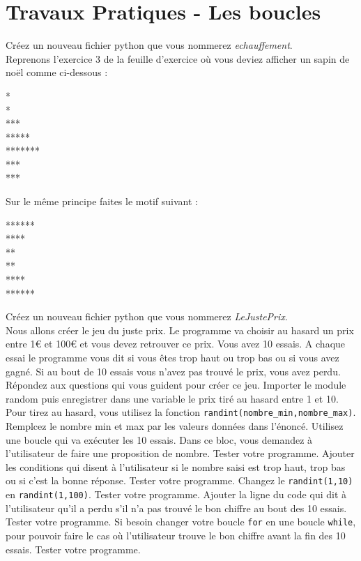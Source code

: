 \chapter*{Travaux Pratiques - Les boucles }

\begin{Exercise}[title={Echauffement}]
Créez un nouveau fichier python que vous nommerez \textit{echauffement}.\\
Reprenons l'exercice 3 de la feuille d'exercice où vous deviez afficher un sapin de noël comme ci-dessous :
\begin{center}
    *\\
    *\\
   ***\\
  *****\\
 *******\\
   ***\\
   ***\\
\end{center}
\Question Sur le même principe faites le motif suivant :
\begin{center}
******\\
 ****\\
  **\\
  **\\
 ****\\
******\\
\end{center}
\end{Exercise}

\begin{Exercise}[title={Le juste prix}]
Créez un nouveau fichier python que vous nommerez \textit{LeJustePrix}.\\
Nous allons créer le jeu du juste prix. Le programme va choisir au hasard un prix entre 1€ et 100€ et vous devez retrouver ce prix. Vous avez 10 essais. A chaque essai le programme vous dit si vous êtes trop haut ou trop bas ou si vous avez gagné. Si au bout de 10 essais vous n'avez pas trouvé le prix, vous avez perdu. \\
Répondez aux questions qui vous guident pour créer ce jeu.
\Question Importer le module random puis enregistrer dans une variable le prix tiré au hasard entre 1 et 10. Pour tirez au hasard, vous utilisez la fonction \texttt{randint(nombre\_min,nombre\_max)}. Remplcez le nombre min et max par les valeurs données dans l'énoncé.
\Question Utilisez une boucle qui va exécuter les 10 essais. Dans ce bloc, vous demandez à l'utilisateur de faire une proposition de nombre. Tester votre programme.
\Question Ajouter les conditions qui disent à l'utilisateur si le nombre saisi est trop haut, trop bas ou si c'est la bonne réponse. Tester votre programme.
\Question Changez le \texttt{randint(1,10)} en \texttt{randint(1,100)}. Tester votre programme.
\Question Ajouter la ligne du code qui dit à l'utilisateur qu'il a perdu s'il n'a pas trouvé le bon chiffre au bout des 10 essais. Tester votre programme.
\Question Si besoin changer votre boucle \texttt{for} en une boucle \texttt{while}, pour pouvoir faire le cas où l'utilisateur trouve le bon chiffre avant la fin des 10 essais. Tester votre programme.
    
\end{Exercise}

